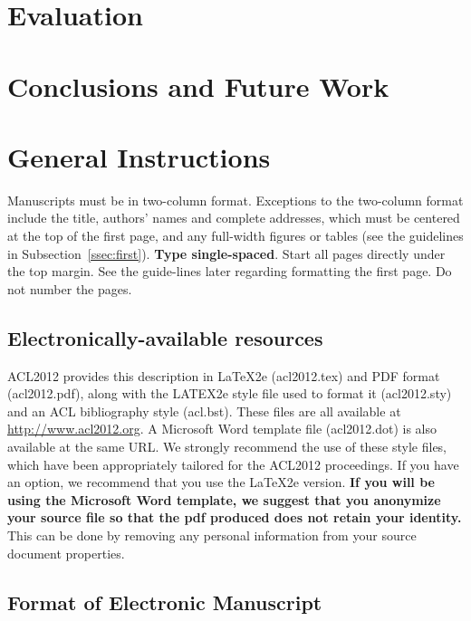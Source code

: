 \documentclass[11pt]{article}
\begin{document}
\section{Evaluation}

\section{Conclusions and Future Work}

\section{General Instructions}

Manuscripts must be in two-column format. Exceptions to the two-column format include the title, 
authors' names and complete addresses, which must be centered at the top of the first page, 
and any full-width figures or tables (see the guidelines in Subsection~\ref{ssec:first}). {\bf Type single-spaced}. 
Start all pages directly under the top margin. See the guide-lines later regarding formatting the first page. Do not number the pages.

\subsection{Electronically-available resources}

ACL2012 provides this description in \LaTeX2e (acl2012.tex) and PDF format (acl2012.pdf), along with the LATEX2e style file used to format it (acl2012.sty) and an ACL bibliography style (acl.bst). These files are all available at \url{http://www.acl2012.org}.  A Microsoft Word template file (acl2012.dot) is also available at the same URL. We strongly recommend the use of these style files, which have been appropriately tailored for the ACL2012 proceedings. If you have an option, we recommend that you use the \LaTeX2e version. \textbf{If you will be using the Microsoft Word template, we suggest that you anonymize your source file so that the pdf produced does not retain your identity.} This can be done by removing any personal information from your source
document properties.


\subsection{Format of Electronic Manuscript}
\label{sect:pdf}
\end{document}
